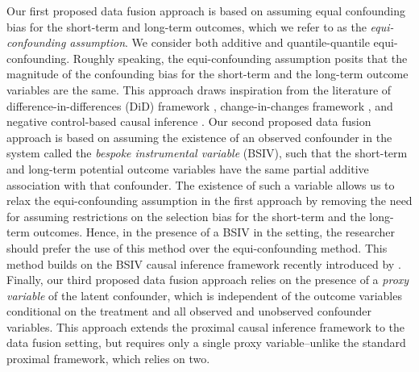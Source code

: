 \documentclass[10pt]{article}
\begin{document}
Our first proposed data fusion approach is based on assuming equal confounding bias for the short-term and long-term outcomes, which we refer to as the \emph{equi-confounding assumption}. We consider both additive and quantile-quantile equi-confounding. Roughly speaking, the equi-confounding assumption posits that the magnitude of the confounding bias for the short-term and the long-term outcome variables are the same. This approach draws inspiration from the literature of difference-in-differences (DiD) framework \citep{card1990impact, angrist2008mostly}, change-in-changes framework \citep{athey2006identification}, and negative control-based causal inference \citep{lipsitch2010negative,tchetgen2014control,sofer2016negative}. 
Our second proposed data fusion approach is based on assuming the existence of an observed confounder in the system called the \emph{bespoke instrumental variable} (BSIV), such that the short-term and long-term potential outcome variables have the same partial additive association with that confounder. The existence of such a variable allows us to relax the equi-confounding assumption in the first approach by removing the need for assuming restrictions on the selection bias for the short-term and the long-term outcomes. Hence, in the presence of a BSIV in the setting, the researcher should prefer the use of this method over the equi-confounding method. This method builds on the BSIV causal inference framework recently introduced by \cite{richardson2022bespoke}.
Finally, our third proposed data fusion approach relies on the presence of a \emph{proxy variable} of the latent confounder, which is independent of the outcome variables conditional on the treatment and all observed and unobserved confounder variables. This approach extends the proximal causal inference framework \citep{miao2018identifying,tchetgen2020introduction,cui2020semiparametric} to the data fusion setting, but requires only a single proxy variable--unlike the standard proximal framework, which relies on two.
\end{document}
